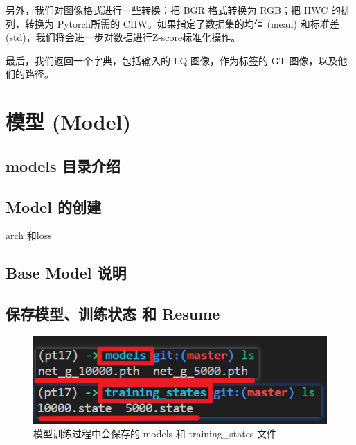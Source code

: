 \documentclass[../main.tex]{subfiles}
\begin{document}
另外，我们对图像格式进行一些转换：把 BGR 格式转换为 RGB；把 HWC 的排列，转换为 Pytorch所需的 CHW。如果指定了数据集的均值 (mean) 和标准差 (std)，我们将会进一步对数据进行Z-score标准化操作。

最后，我们返回一个字典，包括输入的 LQ 图像，作为标签的 GT 图像，以及他们的路径。

\section{模型 (Model)}\label{code_structure:model}
\subsection{models 目录介绍}\label{code_structure:model_contents}

\subsection{Model 的创建}\label{code_structure:model_creation}

arch 和loss

\subsection{Base Model 说明}\label{code_structure:dataset_example}


\subsection{保存模型、训练状态 和 Resume}\label{code_structure:dataset_prefecth}


\begin{figure}[H]
    \begin{center}
        \includegraphics[width=0.7\linewidth]{figures/getting_start_4.png}
        \caption{模型训练过程中会保存的 models 和 training\_states 文件}
        \label{fig:getting_start_4}
    \end{center}
    \vspace{-0.5cm}
\end{figure}
\end{document}
